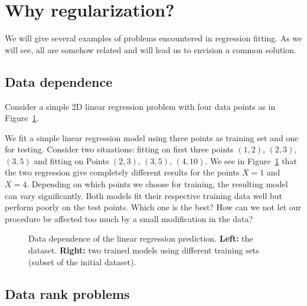 \section{Why regularization?}

We will give several examples of problems encountered in regression fitting.
As we will see, all are somehow related and will lead us to envision a common
solution.

\subsection{Data dependence}

Consider a simple 2D linear regression problem with four data points as in
Figure~\ref{fig:ch4-data-dep}.

We fit a simple linear regression model using three points as training set
and one for testing. Consider two situations: fitting on first three points $(1, 2)$,
$(2, 3)$, $(3, 5)$ and fitting on Points $(2, 3)$, $(3, 5)$, $(4, 10)$. We see in Figure~\ref{fig:ch4-data-dep} that
the two regression give completely different results for the points $X = 1$ and
$X = 4$. Depending on which points we choose for training, the resulting model
can vary significantly. Both models fit their respective training data well but
perform poorly on the test points. Which one is the best? How can we not
let our procedure be affected too much by a small modification in the data?

\begin{figure}[h]\centering
\caption{Data dependence of the linear regression prediction. \textbf{Left:} the dataset. \textbf{Right:} two trained models using different training sets (subset of the initial dataset).}\label{fig:ch4-data-dep}
\end{figure}

\subsection{Data rank problems}


